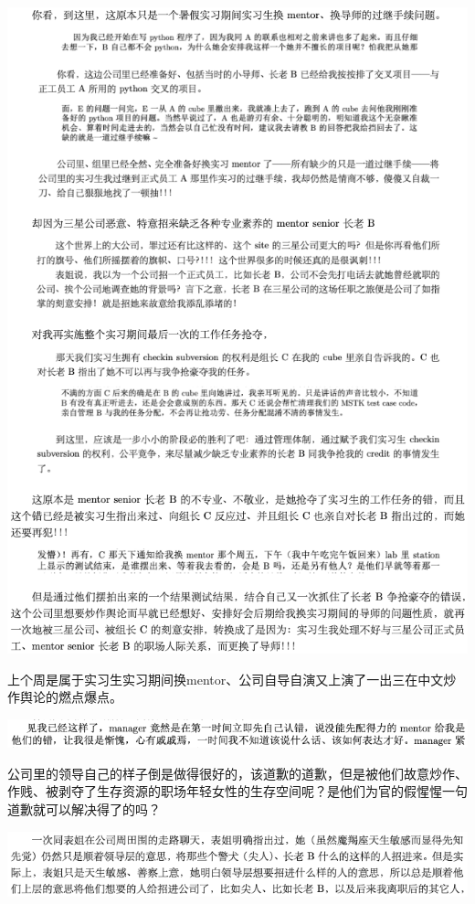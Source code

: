 \documentclass[9pt, b5paper]{article}
\begin{document}
\begin{center}
\includegraphics[width=.9\linewidth]{./pic/backups_plans_20210511_101118.png}
\end{center}

上个周是属于实习生实习期间换mentor、公司自导自演又上演了一出三在中文炒作舆论的燃点爆点。

\begin{center}
\includegraphics[width=.9\linewidth]{./pic/backups_plans_20210511_102103.png}
\end{center}

公司里的领导自己的样子倒是做得很好的，该道歉的道歉，但是被他们故意炒作、作贱、被剥夺了生存资源的职场年轻女性的生存空间呢？是他们为官的假惺惺一句道歉就可以解决得了的吗？

\begin{center}
\includegraphics[width=.9\linewidth]{./pic/backups_plans_20210511_102539.png}
\end{center}
\end{document}
